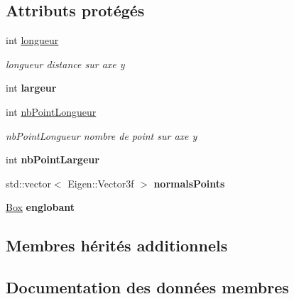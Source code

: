 \subsection*{Attributs protégés}
\begin{DoxyCompactItemize}
\item 
int \hyperlink{class_terrain_afb6ae76bf574629e089f086eaf18036a}{longueur}
\begin{DoxyCompactList}\small\item\em longueur distance sur axe y \end{DoxyCompactList}\item 
\hypertarget{class_terrain_adb3b6bc73480613208c75732db573507}{}int {\bfseries largeur}\label{class_terrain_adb3b6bc73480613208c75732db573507}

\item 
int \hyperlink{class_terrain_a7a4093259732066a936d06873a498f08}{nb\+Point\+Longueur}
\begin{DoxyCompactList}\small\item\em nb\+Point\+Longueur nombre de point sur axe y \end{DoxyCompactList}\item 
\hypertarget{class_terrain_a2dc522f5160a0e1b1307ec9cc649891f}{}int {\bfseries nb\+Point\+Largeur}\label{class_terrain_a2dc522f5160a0e1b1307ec9cc649891f}

\item 
\hypertarget{class_terrain_ad6aee53638c324209a0070e09633c453}{}std\+::vector$<$ Eigen\+::\+Vector3f $>$ {\bfseries normals\+Points}\label{class_terrain_ad6aee53638c324209a0070e09633c453}

\item 
\hypertarget{class_terrain_a5129f793b398fac0054121fa5a572a21}{}\hyperlink{class_box}{Box} {\bfseries englobant}\label{class_terrain_a5129f793b398fac0054121fa5a572a21}

\end{DoxyCompactItemize}
\subsection*{Membres hérités additionnels}


\subsection{Documentation des données membres}
\hypertarget{class_terrain_afb6ae76bf574629e089f086eaf18036a}{}
